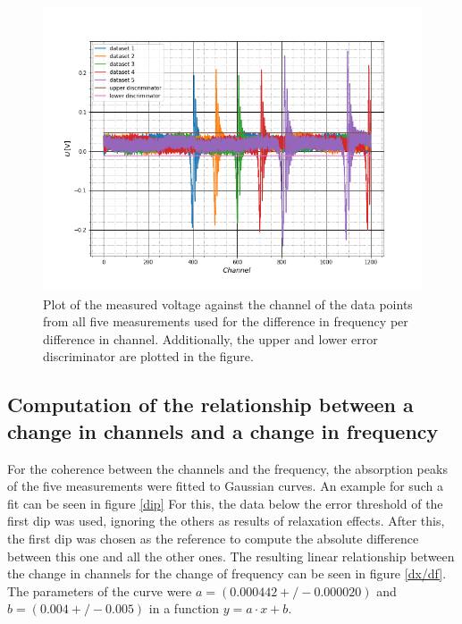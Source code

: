 \begin{figure}[h]
	\includegraphics[scale=0.5]{Bild/all_dx_discr}
	\centering
	\caption[Plot of all data used for discriminator determination and the discriminators]{Plot of the measured voltage against the channel of the data points from all five measurements used for the difference in frequency per difference in channel. Additionally, the upper and lower error discriminator are plotted in the figure.}
	\label{err_threshs}
\end{figure}


\FloatBarrier
\subsection{Computation of the relationship between a change in channels and a change in frequency}
For the coherence between the channels and the frequency, the absorption peaks of the five measurements were fitted to Gaussian curves. An example for such a fit can be seen in figure \ref{dip} For this, the data below the error threshold of the first dip was used, ignoring the others as results of relaxation effects. After this, the first dip was chosen as the reference to compute the absolute difference between this one and all the other ones. 
The resulting linear relationship between the change in channels for the change of frequency can be seen in figure \ref{dx/df}. The parameters of the curve were  $a = (0.000442+/-0.000020)$ and $b=(0.004+/-0.005)$ in a function $y = a\cdot x+b$.

